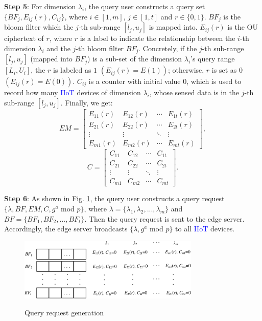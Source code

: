 \documentclass[IEEE JOURNAL OF BIOMEDICAL AND HEALTH INFORMATICS]{IEEEtran}
\begin{document}
{\textbf{Step 5}: For dimension $\lambda_i$, the query user constructs a query set $\{BF_j, E_{ij}(r), C_{ij}\}$, where $i\in [1, m]$, $j \in [1, t]$ and $r \in \{0, 1\}$. $BF_j$ is the bloom filter which the $j$-th sub-range $[l_j, u_j]$ is mapped into. $E_{ij}(r)$ is the OU ciphertext of $r$, where $r$ is a label to indicate the relationship between the $i$-th dimension $\lambda_i$ and the $j$-th bloom filter $BF_j$. Concretely, if the $j$-th sub-range $[l_j, u_j]$ (mapped into $BF_j$) is a sub-set of the dimension $\lambda_i$'s query range $[L_i, U_i]$, the $r$ is labeled as $1$ $(E_{ij}(r)=E(1))$; otherwise, $r$ is set as $0$ $(E_{ij}(r)=E(0))$.  $C_{ij}$ is a counter with initial value $0$, which is used to record how many \textcolor{blue}{IIoT} devices of dimension $\lambda_i$, whose sensed data is in the $j$-th sub-range $[l_j, u_j]$. Finally, we get:
	$$EM = {\left [\begin{array}{cccc}
					E_{11}(r) & E_{12}(r) & \cdots & E_{1t}(r)\\
					E_{21}(r) & E_{22}(r) & \cdots & E_{2t}(r)\\
					\vdots    & \vdots    & \ddots & \vdots\\
					E_{m1}(r) & E_{m2}(r) & \cdots & E_{mt}(r)
					\end{array} \right] },$$
	$$C= \left [
		\begin{array}{cccc}
			C_{11} & C_{12} & \cdots & C_{1t}\\
			C_{21} & C_{22} & \cdots & C_{2t}\\
			\vdots & \vdots  & \ddots & \vdots\\
			C_{m1} & C_{m2} & \cdots & C_{mt}
		\end{array}	
		\right].$$
		
\textbf{Step 6}: As shown in Fig. \ref{query request}, the query user constructs a query request $\{\lambda, BF, EM, C, g^a$ mod $p\}$, where $\lambda=\{\lambda_1, \lambda_2, ..., \lambda_m\}$ and $BF=\{BF_1, BF_2, ..., BF_t\}$. Then the query request is sent to the edge server. Accordingly, the edge server broadcasts $\{\lambda,  g^a$ mod $p\}$ to all \textcolor{blue}{IIoT} devices.

	\begin{figure}
		\centering
		\includegraphics[width=3.4in]{query_request_model}\\
		\caption{Query request generation}\label{query request}
	\end{figure}
	

}
\end{document}

